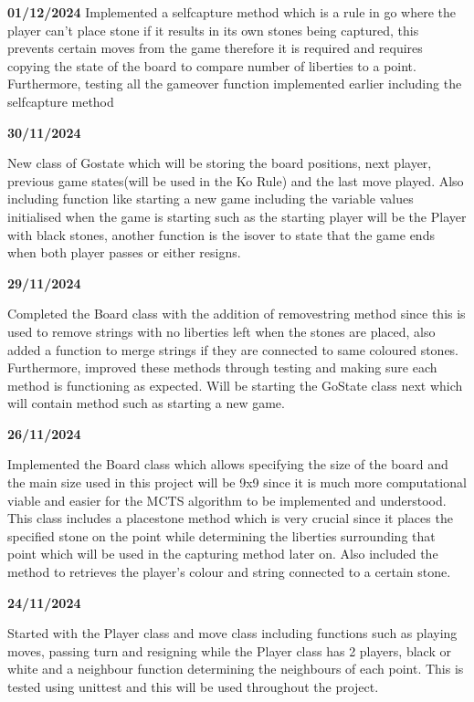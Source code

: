 \documentclass[]{final_report}
\begin{document}
\textbf{01/12/2024}
Implemented a selfcapture method which is a rule in go where the player can't place stone if it results in its own stones being captured, this prevents certain moves from the game therefore it is required and requires copying the state of the board to compare number of liberties to a point. Furthermore, testing all the gameover function implemented earlier including the selfcapture method
  
\textbf{30/11/2024}

New class of Gostate which will be storing the board positions, next player, previous game states(will be used in the Ko Rule) and the last move played. Also including function like starting a new game including the variable values initialised when the game is starting such as the starting player will be the Player with black stones, another function is the isover to state that the game ends when both player passes or either resigns.
  
\textbf{29/11/2024}

Completed the Board class with the addition of removestring method since this is used to remove strings with no liberties left when the stones are placed, also added a function to merge strings if they are connected to same coloured stones. Furthermore, improved these methods through testing and making sure each method is functioning as expected. Will be starting the GoState class next which will contain method such as starting a new game. 

\textbf{26/11/2024}

Implemented the Board class which allows specifying the size of the board and the main size used in this project will be 9x9 since it is much more computational viable and easier for 
the MCTS algorithm to be implemented and understood. This class includes a placestone method which is very crucial since it places the specified stone on the point while determining 
the liberties surrounding that point which will be used in the capturing method later on. Also included the method to retrieves the player's colour and string connected to a certain stone.
  
\textbf{24/11/2024}

Started with the Player class and move class including functions such as playing moves, passing turn and resigning while the Player class has 2 players, black or white and a neighbour function determining the neighbours of each point. This is tested using unittest and this will be used throughout the project.
  
\end{document}
